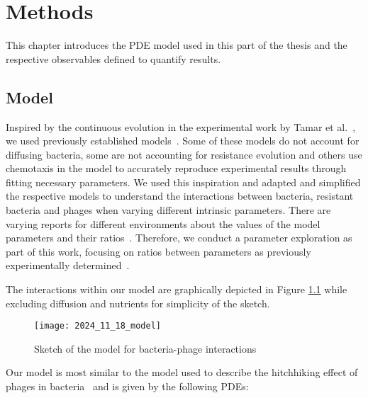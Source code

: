\chapter{Methods}
\label{chap:phage_methods}

This chapter introduces the PDE model used in this part of the thesis and the respective observables defined to quantify results.

\section{Model}
Inspired by the continuous evolution in the experimental work by Tamar et al.~\cite{ShaerTamar2022}, we used previously established models~\cite{Ping2020, Wang2024, Smith2011, Yin1992}. Some of these models do not account for diffusing bacteria, some are not accounting for resistance evolution and others use chemotaxis in the model to accurately reproduce experimental results through fitting necessary parameters. We used this inspiration and adapted and simplified the respective models to understand the interactions between bacteria, resistant bacteria and phages when varying different intrinsic parameters.
There are varying reports for different environments about the values of the model parameters and their ratios~\cite{Eriksen2020, Ping2020}.
Therefore, we conduct a parameter exploration as part of this work, focusing on ratios between parameters as previously experimentally determined~\cite{Tavaddod2011, Moldovan2007, Payne2018}.

The interactions within our model are graphically depicted in Figure \ref{fig:model_sketch} while excluding diffusion and nutrients for simplicity of the sketch.

\begin{figure}
\centering
\texttt{[image: 2024\_11\_18\_model]}
\caption{Sketch of the model for bacteria-phage interactions}
\label{fig:model_sketch}
\end{figure}

Our model is most similar to the model used to describe the hitchhiking effect of phages in bacteria~\cite{Ping2020} and is given by the following PDEs:

